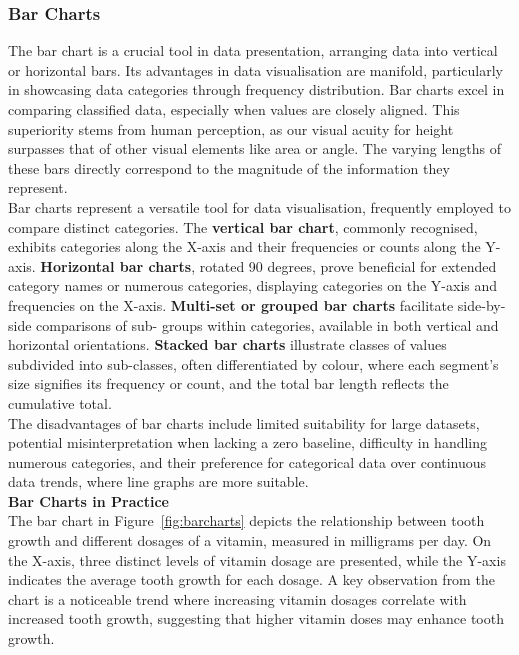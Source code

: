 \documentclass{article}\usepackage[]{graphicx}\usepackage[]{xcolor}
\begin{document}
\subsubsection{Bar Charts}
\noindent The bar chart is a crucial tool in data presentation, arranging data into vertical or horizontal bars. Its advantages in data visualisation are manifold, particularly in showcasing data categories through frequency distribution. Bar charts excel in comparing classified data, especially when values are closely aligned. This superiority stems from human perception, as our visual acuity for height surpasses that of other visual elements like area or angle. The varying lengths of these bars directly correspond to the magnitude of the information they represent.\\

\noindent Bar charts represent a versatile tool for data visualisation, frequently employed to compare distinct categories. The \textbf{vertical bar chart}, commonly recognised, exhibits categories along the X-axis and their frequencies or counts along the Y-axis. \textbf{Horizontal bar charts}, rotated 90 degrees, prove beneficial for extended category names or numerous categories, displaying categories on the Y-axis and frequencies on the X-axis. \textbf{Multi-set or grouped bar charts} facilitate side-by-side comparisons of sub- groups within categories, available in both vertical and horizontal orientations. \textbf{Stacked bar charts} illustrate classes of values subdivided into sub-classes, often differentiated by colour, where each segment's size signifies its frequency or count, and the total bar length reflects the cumulative total.\\

\noindent The disadvantages of bar charts include limited suitability for large datasets, potential misinterpretation when lacking a zero baseline, difficulty in handling numerous categories, and their preference for categorical data over continuous data trends, where line graphs are more suitable.\\

\noindent \textbf{Bar Charts in Practice}\\
\noident The bar chart in Figure~\ref{fig:barcharts} depicts the relationship between tooth growth and different dosages of a vitamin, measured in milligrams per day. On the X-axis, three distinct levels of vitamin dosage are presented, while the Y-axis indicates the average tooth growth for each dosage. A key observation from the chart is a noticeable trend where increasing vitamin dosages correlate with increased tooth growth, suggesting that higher vitamin doses may enhance tooth growth.
\end{document}
